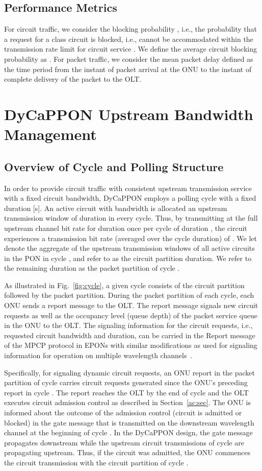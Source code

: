 \documentclass[article]{IEEEtran}
\begin{document}
\subsection{Performance Metrics}
For circuit traffic, we consider the blocking probability
, i.e., the probability that a request
for a class  circuit is blocked, i.e., cannot be accommodated within
the transmission rate limit for circuit service .
We define the average circuit blocking probability as
.
For packet traffic, we consider the mean packet
delay  defined as
the time period from the instant of packet arrival at the ONU
to the instant of complete delivery of the packet to the OLT.


\section{DyCaPPON Upstream Bandwidth Management}
\label{dycappon:sec}
\subsection{Overview of Cycle and Polling Structure}
In order to provide circuit traffic with consistent upstream transmission
service with a fixed circuit bandwidth, DyCaPPON employs a polling cycle
with a fixed duration  [s].
An active circuit with bandwidth  is allocated an upstream
transmission window of duration  in every cycle.
Thus, by transmitting at the full upstream channel bit rate 
for duration  once per cycle of duration ,
the circuit experiences a transmission bit rate
(averaged over the cycle duration) of .
We let  denote the aggregate of the upstream
transmission windows of all active circuits in the PON in cycle ,
and refer to  as the circuit partition duration.
We refer to the remaining duration  as the
packet partition of cycle .


As illustrated in Fig.~\ref{fig:cycle}, a given cycle  consists
of the circuit partition followed by the packet partition. During
the packet partition of each cycle, each ONU sends a report message
to the OLT. The report message signals new circuit requests as well
as the occupancy level (queue depth) of the packet service queue in
the ONU to the OLT. The signaling information for the circuit
requests, i.e., requested circuit bandwidth and duration, can be
carried in the Report message of the MPCP protocol in EPONs with
similar modifications as used for signaling information for
operation on multiple wavelength channels~\cite{McGR06}.

Specifically, for signaling dynamic circuit requests,
an ONU report in the packet partition of cycle 
carries circuit requests generated since the ONU's preceding
report in cycle . The report reaches the
OLT by the end of cycle  and the OLT executes
circuit admission control as described in Section~\ref{ac:sec}.
The ONU is informed about the outcome of the admission control
(circuit is admitted or blocked)
in the gate message that is transmitted on the downstream wavelength
channel at the beginning of cycle .
In the DyCaPPON design, the gate message propagates downstream while
the upstream circuit transmissions of cycle  are
propagating upstream.
Thus, if the circuit was admitted, the ONU commences the
circuit transmission with the circuit partition of cycle .
\end{document}
